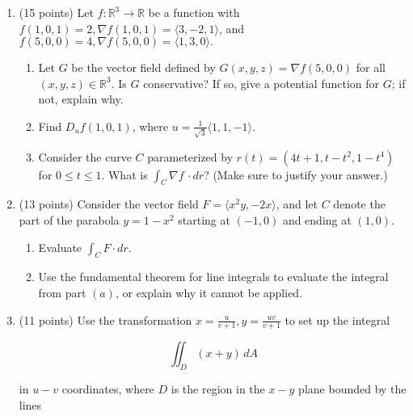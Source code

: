 \documentclass[12 pt]{report}
\begin{document}
\newpage
\begin{enumerate}

\item (15 points) Let $f:\mathbb{R}^3 \to \mathbb{R}$ be a function with $f(1,0,1) = 2, \nabla f(1,0,1) = \langle 3, -2, 1 \rangle$, and $f(5,0,0) = 4, \nabla f(5,0,0) = \langle 1, 3, 0 \rangle.$  

\begin{enumerate} \item Let $G$ be the vector field defined by $G(x,y,z) = \nabla f(5,0,0)$ for all $(x,y,z) \in \mathbb{R}^3$. Is $G$ conservative? If so, give a potential function for $G$; if not, explain why. 

\vfill

\item Find $D_u f(1,0,1)$, where $u = \frac{1}{\sqrt{3}} \langle 1, 1, -1 \rangle.$

\vfill 

\item Consider the curve $C$ parameterized by $r(t) = (4t+1, t-t^2, 1-t^4)$ for $0 \leq t \leq 1$. What is $\int_C \nabla f \, \cdot dr$? (Make sure to justify your answer.)

\end{enumerate} 

\vfill

\newpage

\item (13 points) Consider the vector field $F = \langle x^2 y, -2x \rangle$, and let $C$ denote the part of the parabola $y = 1-x^2$ starting at $(-1,0)$ and ending at $(1,0)$. 

\begin{enumerate} \item Evaluate $\int_C F \cdot dr.$ 

\vfill 

\item Use the fundamental theorem for line integrals to evaluate the integral from part $(a)$, or explain why it cannot be applied. 

\vfill 

\end{enumerate}

\newpage


\item (11 points) Use the transformation $x = \frac{u}{v+1}, y = \frac{uv}{v+1}$ to set up the integral

\[
\iint_D (x+y) \, dA 
\]

in $u-v$ coordinates, where $D$ is the region in the $x-y$ plane bounded by the lines 


\end{enumerate}
\end{document}
